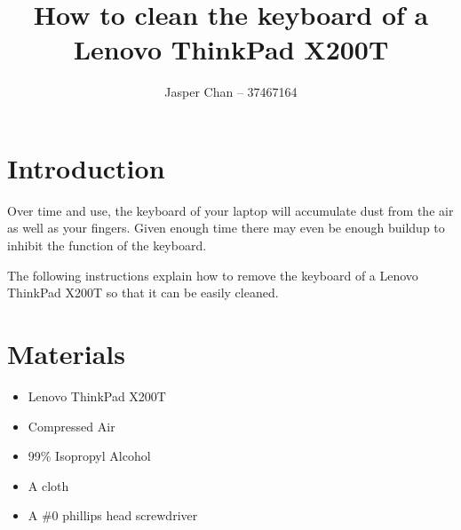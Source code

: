 \documentclass{article}
\title{How to clean the keyboard of a Lenovo ThinkPad X200T}
\author{Jasper Chan -- 37467164}
\begin{document}
\maketitle

\section*{Introduction}
Over time and use, the keyboard of your laptop will accumulate dust from the air as well as your fingers.
Given enough time there may even be enough buildup to inhibit the function of the keyboard.

\vspace{12pt} %

\noindent The following instructions explain how to remove the keyboard of a Lenovo ThinkPad X200T so that it can be easily cleaned.

\section*{Materials}
\begin{itemize}
	\item Lenovo ThinkPad X200T
	\item Compressed Air
	\item 99\% Isopropyl Alcohol
	\item A cloth
	\item A \#0 phillips head screwdriver
\end{itemize}

\clearpage
\end{document}
